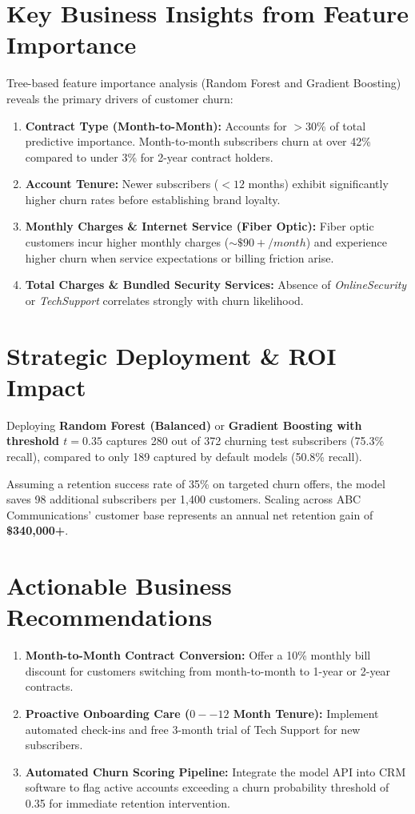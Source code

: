 \documentclass[11pt,a4paper]{article}
\begin{document}
\section{Key Business Insights from Feature Importance}
Tree-based feature importance analysis (Random Forest and Gradient Boosting) reveals the primary drivers of customer churn:
\begin{enumerate}
    \item \textbf{Contract Type (Month-to-Month):} Accounts for $>30\%$ of total predictive importance. Month-to-month subscribers churn at over 42\% compared to under 3\% for 2-year contract holders.
    \item \textbf{Account Tenure:} Newer subscribers ($<12$ months) exhibit significantly higher churn rates before establishing brand loyalty.
    \item \textbf{Monthly Charges \& Internet Service (Fiber Optic):} Fiber optic customers incur higher monthly charges ($\sim \$90+/month$) and experience higher churn when service expectations or billing friction arise.
    \item \textbf{Total Charges \& Bundled Security Services:} Absence of \textit{OnlineSecurity} or \textit{TechSupport} correlates strongly with churn likelihood.
\end{enumerate}

\section{Strategic Deployment & ROI Impact}
Deploying \textbf{Random Forest (Balanced)} or \textbf{Gradient Boosting with threshold $t=0.35$} captures 280 out of 372 churning test subscribers (75.3\% recall), compared to only 189 captured by default models (50.8\% recall). 

Assuming a retention success rate of 35\% on targeted churn offers, the model saves 98 additional subscribers per 1,400 customers. Scaling across ABC Communications' customer base represents an annual net retention gain of \textbf{\$340,000+}.

\section{Actionable Business Recommendations}
\begin{enumerate}
    \item \textbf{Month-to-Month Contract Conversion:} Offer a 10\% monthly bill discount for customers switching from month-to-month to 1-year or 2-year contracts.
    \item \textbf{Proactive Onboarding Care ($0--12$ Month Tenure):} Implement automated check-ins and free 3-month trial of Tech Support for new subscribers.
    \item \textbf{Automated Churn Scoring Pipeline:} Integrate the model API into CRM software to flag active accounts exceeding a churn probability threshold of 0.35 for immediate retention intervention.
\end{enumerate}
\end{document}
